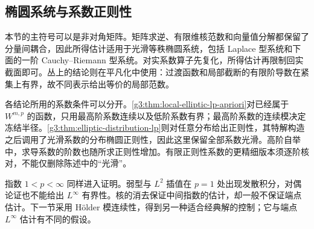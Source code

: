 \subsection{椭圆系统与系数正则性}
\label{g3:subsec:1204:06}
本节的主符号可以是非对角矩阵。矩阵求逆、有限维核范数和向量值分解都保留了分量间耦合，因此所得估计适用于光滑等秩椭圆系统，包括 Laplace 型系统和下面的一阶 Cauchy--Riemann 型系统。对实系数算子先复化，所得估计再限制回实截面即可。丛上的结论则在平凡化中使用：过渡函数和局部截断的有限阶导数在紧集上有界，故不同表示给出等价的局部范数。

\ProseParagraphBreak

各结论所用的系数条件可以分开。\cref{g3:thm:local-elliptic-lp-apriori}对已经属于 \(W^{m,p}\) 的函数，只用最高阶系数连续以及低阶系数有界；最高阶系数的连续模决定冻结半径。\cref{g3:thm:elliptic-distribution-lp}则对任意分布给出正则性，其特解构造之后调用了光滑系数的分布椭圆正则性，因此这里保留全部系数光滑。高阶自举中，求导系数的阶数也随所求正则性增加。有限正则性系数的更精细版本须逐阶核对，不能仅删除陈述中的“光滑”。

\ProseParagraphBreak

指数 \(1<p<\infty\) 同样进入证明。弱型与 \(L^2\) 插值在 \(p=1\) 处出现发散积分，对偶论证也不能给出 \(L^\infty\) 有界性。核的消去保证中间指数的估计，却一般不保证端点估计。下一节采用 Hölder 模连续性，得到另一种适合经典解的控制；它与端点 \(L^\infty\) 估计有不同的假设。
